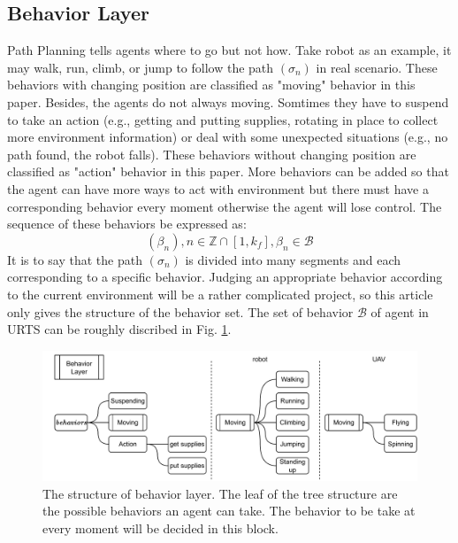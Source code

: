 \documentclass{ieeeaccess}
\begin{document}
\subsection{Behavior Layer}
Path Planning tells agents where to go but not how. Take robot as an example, it may walk, run, climb, or jump to follow the path $(\sigma_n)$ in real scenario. These behaviors with changing position are classified as "moving" behavior in this paper. Besides, the agents do not always moving. Somtimes they have to suspend to take an action (e.g., getting and putting supplies, rotating in place to collect more environment information) or deal with some unexpected situations (e.g., no path found, the robot falls). These behaviors without changing position are classified as "action" behavior in this paper. More behaviors can be added so that the agent can have more ways to act with environment but there must have a corresponding behavior every moment otherwise the agent will lose control. The sequence of these behaviors be expressed as:
\begin{equation}
    (\beta_n), n\in\mathbb{Z}\cap[1,k_f], \beta_n\in\mathcal{B}
\end{equation}
It is to say that the path $(\sigma_n)$ is divided into many segments and each corresponding to a specific behavior. Judging an appropriate behavior according to the current environment will be a rather complicated project, so this article only gives the structure of the behavior set. The set of behavior $\mathcal{B}$ of agent in URTS can be roughly discribed in Fig. \ref{fig:behavior}.

\begin{figure}[htbp]
    \centering
    \includegraphics[scale=.5]{fig/behavior.pdf}\caption{The structure of behavior layer. The leaf of the tree structure are the possible behaviors an agent can take. The behavior to be take at every moment will be decided in this block.}%
    \label{fig:behavior}
\end{figure}
\end{document}
